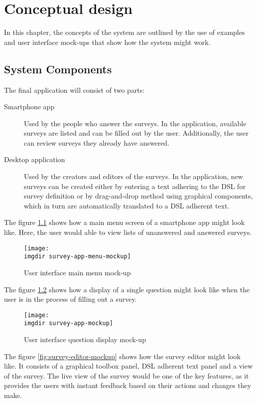 \chapter{Conceptual design}
\label{chap:examples}
In this chapter, the concepts of the system are outlined by the use of examples and user interface mock-ups that show how the system might work.

\section{System Components}
\label{sec:systemcomponents}
The final application will consist of two parts: 

\begin{description}
\item[Smartphone app] Used by the people who answer the surveys. In the application, available surveys are listed and can be filled out by the user. Additionally, the user can review surveys they already have answered.
\item[Desktop application] Used by the creators and editors of the surveys. In the application, new surveys can be created either by entering a text adhering to the DSL for survey definition or by drag-and-drop method using graphical components, which in turn are automatically translated to a DSL adherent text.
\end{description}

The figure \ref{fig:survey-app-menu-mockup} shows how a main menu screen of a smartphone app might look like. Here, the user would able to view lists of unanswered and answered surveys.

\begin{figure}[!ht]
  \centering
  \texttt{[image: \\imgdir survey-app-menu-mockup]}
  \caption{User interface main menu mock-up}
  \label{fig:survey-app-menu-mockup}
\end{figure}

The figure \ref{fig:survey-app-mockup} shows how a display of a single question might look like when the user is in the process of filling out a survey.

\begin{figure}[!ht]
  \centering
  \texttt{[image: \\imgdir survey-app-mockup]}
  \caption{User interface question display mock-up}
  \label{fig:survey-app-mockup}
\end{figure}

The figure \ref{fig:survey-editor-mockup} shows how the survey editor might look like. It consists of a graphical toolbox panel, DSL adherent text panel and a view of the survey. The live view of the survey would be one of the key features, as it provides the users with instant feedback based on their actions and changes they make.

